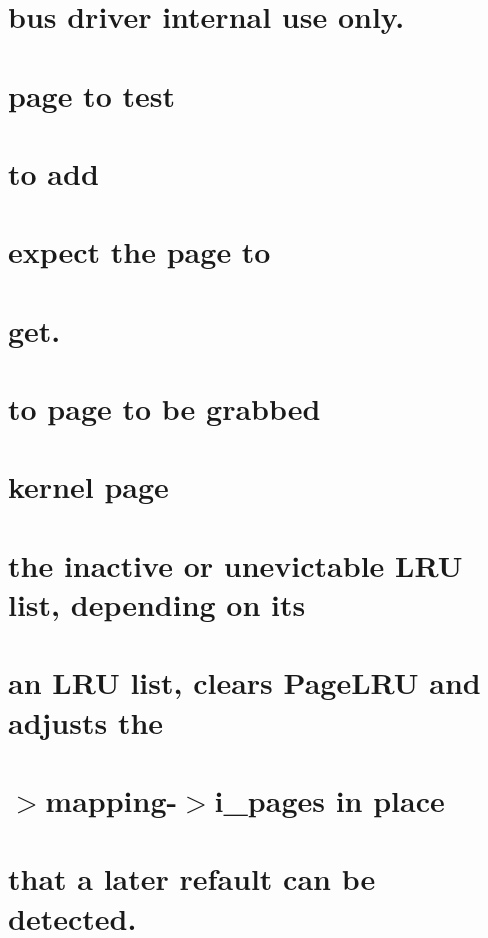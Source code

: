 \let\mypdfximage\pdfximage\def\pdfximage{\immediate\mypdfximage}\documentclass[twoside]{book}
\newcommand{\+}{\discretionary{\mbox{\scriptsize$\hookleftarrow$}}{}{}}
\begin{document}
\chapter{bus driver internal use only.}
\label{i2c_2spi}

\chapter{page to test}
\label{the}

\chapter{to add}
\label{page}

\chapter{expect the page to}
\label{They}

\chapter{get.}
\label{to}

\chapter{to page to be grabbed}
\label{pointer}

\chapter{kernel page}
\label{source}

\chapter{the inactive or unevictable L\+RU list, depending on its}
\label{on}

\chapter{an L\+RU list, clears Page\+L\+RU and adjusts the}
\label{from}

\chapter{$>$mapping-\/$>$i\+\_\+pages in place}
\label{-}
\Hypertarget{-}

\chapter{that a later refault can be detected.}
\label{so}

\end{document}
